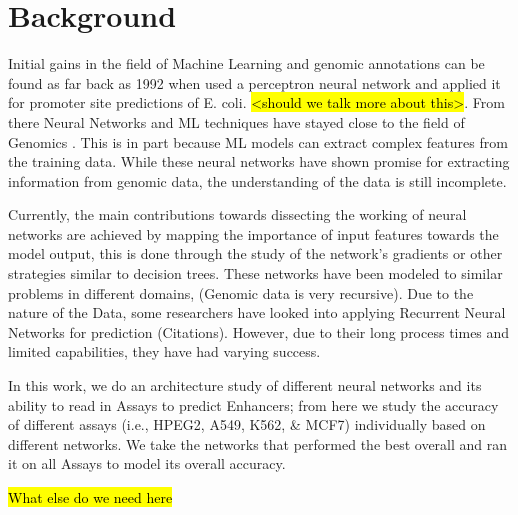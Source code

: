\section*{Background}


Initial gains in the field of Machine Learning and genomic annotations can be found as far back as 1992 when \cite*{horton1992assessment} used a perceptron neural network and applied it for promoter site predictions of E. coli. \hl{<should we talk more about this>}. From there Neural Networks and ML techniques have stayed close to the field of Genomics \cite{eraslan2019deep}.  This is in part because ML models can extract complex features from the training data. While these neural networks have shown promise for extracting information from genomic data, the understanding of the data is still incomplete. 

Currently, the main contributions towards dissecting the working of neural networks are achieved by mapping the importance of input features towards the model output, this is done through the study of the network's gradients or other strategies similar to decision trees. These networks have been modeled to similar problems in different domains, (Genomic data is very recursive). Due to the nature of the Data, some researchers have looked into applying Recurrent Neural Networks for prediction (Citations). However, due to their long process times and limited capabilities, they have had varying success.

In this work, we do an architecture study of different neural networks and its ability to read in Assays to predict Enhancers; from here we study the accuracy of different assays (i.e., HPEG2, A549,  K562, \& MCF7) individually based on different networks. We take the networks that performed the best overall and ran it on all Assays to model its overall accuracy.

\hl{What else do we need here}